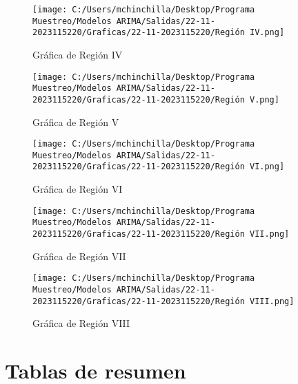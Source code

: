 \documentclass{article}%
\begin{document}
%


\begin{figure}[H]%
\centering%
\texttt{[image: C:/Users/mchinchilla/Desktop/Programa Muestreo/Modelos ARIMA/Salidas/22-11-2023115220/Graficas/22-11-2023115220/Región IV.png]}%
\caption{Gráfica de Región IV}%
\end{figure}

%


\begin{figure}[H]%
\centering%
\texttt{[image: C:/Users/mchinchilla/Desktop/Programa Muestreo/Modelos ARIMA/Salidas/22-11-2023115220/Graficas/22-11-2023115220/Región V.png]}%
\caption{Gráfica de Región V}%
\end{figure}

%


\begin{figure}[H]%
\centering%
\texttt{[image: C:/Users/mchinchilla/Desktop/Programa Muestreo/Modelos ARIMA/Salidas/22-11-2023115220/Graficas/22-11-2023115220/Región VI.png]}%
\caption{Gráfica de Región VI}%
\end{figure}

%


\begin{figure}[H]%
\centering%
\texttt{[image: C:/Users/mchinchilla/Desktop/Programa Muestreo/Modelos ARIMA/Salidas/22-11-2023115220/Graficas/22-11-2023115220/Región VII.png]}%
\caption{Gráfica de Región VII}%
\end{figure}

%


\begin{figure}[H]%
\centering%
\texttt{[image: C:/Users/mchinchilla/Desktop/Programa Muestreo/Modelos ARIMA/Salidas/22-11-2023115220/Graficas/22-11-2023115220/Región VIII.png]}%
\caption{Gráfica de Región VIII}%
\end{figure}

%
\section{Tablas de resumen}%
\label{sec:Tablasderesumen}%
\end{document}
